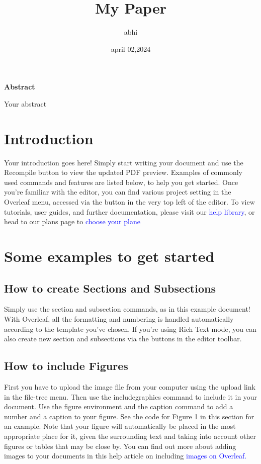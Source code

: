 \documentclass{article}
\title{My Paper}
\author{abhi}
\date{april 02,2024}
\begin{document}
	\maketitle
	\begin{center}
		\textbf{Abstract}
	\end{center}
	Your abstract
	\section{Introduction}
	Your introduction goes here! Simply start writing your document and use the Recompile button to
	view the updated PDF preview. Examples of commonly used commands and features are listed below,
	to help you get started.
	Once you’re familiar with the editor, you can find various project setting in the Overleaf menu,
	accessed via the button in the very top left of the editor. To view tutorials, user guides, and further
	documentation, please visit our \textcolor{blue}{help library}, or head to our plans page to \textcolor{blue}{choose your plane}
	\section{Some examples to get started}
	\subsection{How to create Sections and Subsections}
	Simply use the section and subsection commands, as in this example document! With Overleaf, all
	the formatting and numbering is handled automatically according to the template you’ve chosen. If
	you’re using Rich Text mode, you can also create new section and subsections via the buttons in the
	editor toolbar.
	\subsection{How to include Figures}
	First you have to upload the image file from your computer using the upload link in the file-tree menu.
	Then use the includegraphics command to include it in your document. Use the figure environment
	and the caption command to add a number and a caption to your figure. See the code for Figure 1 in
	this section for an example.
	Note that your figure will automatically be placed in the most appropriate place for it, given the
	surrounding text and taking into account other figures or tables that may be close by. You can find
	out more about adding images to your documents in this help article on including \textcolor{blue}{images on Overleaf.}
	
\end{document}
